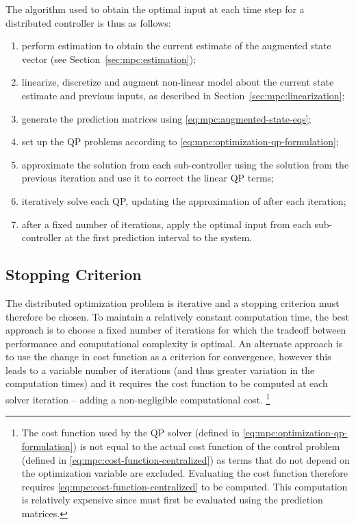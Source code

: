 The algorithm used to obtain the optimal input at each time step for a distributed controller is thus as follows:

\begin{enumerate}
  \item perform estimation to obtain the current estimate of the augmented state vector (see Section~\ref{sec:mpc:estimation});
  \item linearize, discretize and augment non-linear model about the current state estimate and previous inputs, as described in Section~\ref{sec:mpc:linearization};
  \item generate the prediction matrices using \eqref{eq:mpc:augmented-state-eqs};
  \item set up the QP problems according to \eqref{eq:mpc:optimization-qp-formulation};
  \item approximate the solution from each sub-controller using the solution from the previous iteration and use it to correct the linear QP terms;
  \item iteratively solve each QP, updating the approximation of   after each iteration;
  \item after a fixed number of iterations, apply the optimal input from each sub-controller at the first prediction interval to the system.
\end{enumerate}

\subsection{Stopping Criterion}
\label{sec:mpc:distributed:stopping}

The distributed optimization problem is iterative and a stopping criterion must therefore be chosen.
To maintain a relatively constant computation time, the best approach is to choose a fixed number of iterations for which the tradeoff between performance and computational complexity is optimal.
An alternate approach is to use the change in cost function as a criterion for convergence, however this leads to a variable number of iterations (and thus greater variation in the computation times) and it requires the cost function to be computed at each solver iteration -- adding a non-negligible computational cost.
\footnote{The cost function used by the QP solver (defined in \eqref{eq:mpc:optimization-qp-formulation}) is not equal to the actual cost function of the control problem (defined in \eqref{eq:mpc:cost-function-centralized}) as terms that do not depend on the optimization variable are excluded. Evaluating the cost function therefore requires \eqref{eq:mpc:cost-function-centralized} to be computed. This computation is relatively expensive since  must first be evaluated using the prediction matrices.}

